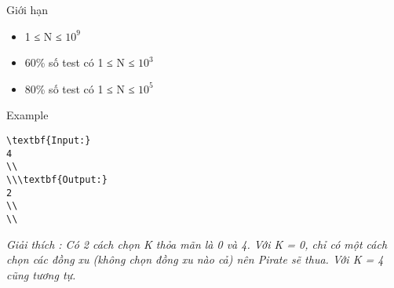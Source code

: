 Giới hạn  
\begin{itemize}
	\item     1 ≤ N ≤ $10^{9}$
	\item     60\% số test có 1 ≤ N ≤ $10^{3}$
	\item     80\% số test có 1 ≤ N ≤ $10^{5}$
\end{itemize}
   Example  
\begin{verbatim}
\textbf{Input:}
4
\\
\\\textbf{Output:}
2
\\
\\\end{verbatim}

\emph{     Giải thích        : Có 2 cách chọn K thỏa mãn là 0 và 4. Với K = 0, chỉ có một cách chọn các đồng xu (không chọn đồng xu nào cả) nên Pirate sẽ thua. Với K = 4 cũng tương tự.    
\\}